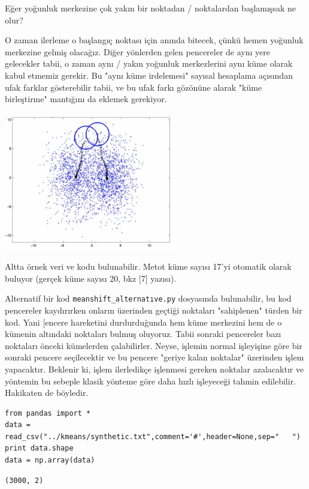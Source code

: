 \documentclass[12pt,fleqn]{article}\usepackage{../../common}
\begin{document}
Eğer yoğunluk merkezine çok yakın bir noktadan / noktalardan
başlamışsak ne olur?

O zaman ilerleme o başlangıç noktası için anında bitecek, çünkü hemen
yoğunluk merkezine gelmiş olacağız. Diğer yönlerden gelen pencereler
de aynı yere gelecekler tabii, o zaman aynı / yakın yoğunluk
merkezlerini aynı küme olarak kabul etmemiz gerekir. Bu "aynı küme
irdelemesi" sayısal hesaplama açısından ufak farklar gösterebilir
tabii, ve bu ufak farkı gözönüne alarak "küme birleştirme" mantığını da
eklemek gerekiyor.

\includegraphics[height=6cm]{start.png}

Altta örnek veri ve kodu bulunabilir. Metot küme sayısı 17'yi otomatik
olarak buluyor (gerçek küme sayısı 20, bkz [7]  yazısı).

Alternatif bir kod \verb!meanshift_alternatıve.py! dosyasında
bulunabilir, bu kod pencereler kaydırırken onların üzerinden geçtiği
noktaları "sahiplenen" türden bir kod. Yani [encere hareketini
durdurduğunda hem küme merkezini hem de o kümenin altındaki noktaları
bulmuş oluyoruz.  Tabii sonraki pencereler bazı noktaları önceki
kümelerden çalabilirler. Neyse, işlemin normal işleyişine göre bir
sonraki pencere seçilecektir ve bu pencere "geriye kalan noktalar"
üzerinden işlem yapacaktır.  Beklenir ki, işlem ilerledikçe işlenmesi
gereken noktalar azalacaktır ve yöntemin bu sebeple klasik yönteme
göre daha hızlı işleyeceği tahmin edilebilir. Hakikaten de böyledir.

\begin{verbatim}
from pandas import *
data = read_csv("../kmeans/synthetic.txt",comment='#',header=None,sep="   ")
print data.shape
data = np.array(data)
\end{verbatim}

\begin{verbatim}
(3000, 2)
\end{verbatim}
\end{document}
